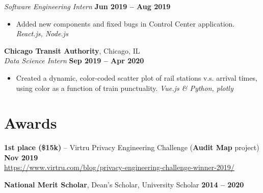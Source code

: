 \documentclass[margin]{resume}
\begin{document}
    \textsl{Software Engineering Intern} \hfill \textbf{Jun 2019 -- Aug 2019}

\begin{itemize}
\item Added new components and fixed bugs in Control Center application. \hfill \textit{React.js, Node.js}
\end{itemize}


    \textcolor{blu}{\textbf{Chicago Transit Authority}}, Chicago, IL \vspace{2mm}\\\vspace{1mm}%
    \textsl{Data Science Intern} \hfill \textbf{Sep 2019 -- Apr 2020}

    \begin{itemize}
\item Created a dynamic, color-coded scatter plot of rail stations v.s. arrival times, \\using color as a function of train punctuality. \hfill \textit{Vue.js \& Python, plotly}



    \end{itemize}



    \section{\mysidestyle Awards}
    \textcolor{blu}{\textbf{1st place (\$15k)}} -- Virtru Privacy Engineering Challenge (\textbf {Audit Map} project) \hfill \textbf{Nov 2019} \\ \url{https://www.virtru.com/blog/privacy-engineering-challenge-winner-2019/}

\textbf{National Merit Scholar}, Dean’s Scholar, University Scholar \hfill \textbf{2014 -- 2020} %
\end{document}
